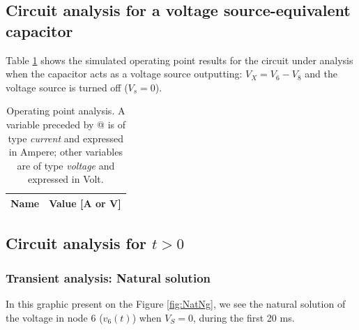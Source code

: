 \subsection{Circuit analysis for a voltage source-equivalent capacitor}

\indent

Table \ref{tab:Op2Ng} shows the simulated operating point results for the circuit under analysis when the capacitor acts as a voltage source outputting: $V_X=V_6-V_8$ and the voltage source is turned off ($V_s=0$).
\begin{table}[H]
  \centering
  \begin{tabular}{|l|r|}
    \hline    
    {\bf Name} & {\bf Value [A or V]} \\ \hline
    
  \end{tabular}
  \caption{Operating point analysis. A variable preceded by @ is of type {\em current}
    and expressed in Ampere; other variables are of type {\it voltage} and expressed in
    Volt.}
  \label{tab:Op2Ng}
\end{table}


\subsection{Circuit analysis for $t>0$}

\indent

\subsubsection{Transient analysis: Natural solution}

\indent

In this graphic  present on the Figure \ref{fig:NatNg}, we see the natural solution of the voltage in node 6 ($v_6(t)$) when $V_S=0$, during the first 20 ms. 


